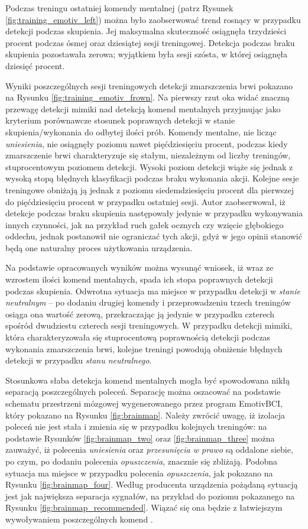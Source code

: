 \documentclass[skorowidz,skroty]{dyplomWEZUT}
\begin{document}
Podczas treningu ostatniej komendy mentalnej (patrz Rysunek \vref{fig:training_emotiv_left}) można było zaobserwować trend rosnący w przypadku detekcji podczas skupienia. Jej maksymalna skuteczność osiągnęła trzydzieści procent podczas ósmej oraz dziesiątej sesji treningowej. Detekcja podczas braku skupienia pozostawała zerowa; wyjątkiem była sesji szósta, w której osiągnęła dziesięć procent. 

Wyniki poszczególnych sesji treningowych detekcji zmarszczenia brwi pokazano na Rysunku \vref{fig:training_emotiv_frown}. Na pierwszy rzut oka widać znaczną przewagę detekcji mimiki nad detekcją komend mentalnych przyjmując jako kryterium porównawcze stosunek poprawnych detekcji w stanie skupienia/wykonania do odbytej ilości prób. Komendy mentalne, nie licząc \textit{uniesienia}, nie osiągnęły poziomu nawet pięćdziesięciu procent, podczas kiedy zmarszczenie brwi charakteryzuje się stałym, niezależnym od liczby treningów, stuprocentowym poziomem detekcji. Wysoki poziom detekcji wiąże się jednak z wysoką stopą błędnych klasyfikacji podczas braku wykonania akcji. Kolejne sesje treningowe obniżają ją jednak z poziomu siedemdziesięciu procent dla pierwszej do pięćdziesięciu procent w przypadku ostatniej sesji. Autor zaobserwował, iż detekcje podczas braku skupienia następowały jedynie w przypadku wykonywania innych czynności, jak na przykład ruch gałek ocznych czy wzięcie głębokiego oddechu, jednak postanowił nie ograniczać tych akcji, gdyż w jego opinii stanowić będą one naturalny proces użytkowania urządzenia.

Na podstawie opracowanych wyników można wysunąć wniosek, iż wraz ze wzrostem ilości komend mentalnych, spada ich stopa poprawnych detekcji podczas skupienia. Odwrotna sytuacja ma miejsce w przypadku detekcji w \textit{stanie neutralnym} -- po dodaniu drugiej komendy i przeprowadzeniu trzech treningów osiąga ona wartość zerową, przekraczając ją jedynie w przypadku czterech spośród dwudziestu czterech sesji treningowych. W przypadku detekcji mimiki, która charakteryzowała się stuprocentową poprawnością detekcji podczas wykonania zmarszczenia brwi, kolejne treningi powodują obniżenie błędnych detekcji w przypadku \textit{stanu neutralnego}.

Stosunkowa słaba detekcja komend mentalnych mogła być spowodowana nikłą separacją poszczególnych poleceń. Separację można oszacować na podstawie schematu przestrzeni mózgowej wygenerowanego przez program EmotivBCI, który pokazano na Rysunku \vref{fig:brainmap}. Należy zwrócić uwagę, iż izolacja poleceń nie jest stała i zmienia się w przypadku kolejnych treningów: na podstawie Rysunków \vref{fig:brainmap_two} oraz \vref{fig:brainmap_three} można zauważyć, iż polecenia \textit{uniesienia} oraz \textit{przesunięcia w prawo} są oddalone siebie, po czym, po dodaniu polecenia \textit{opuszczenia}, znacznie się zbliżają. Podobna sytuacja ma miejsce w przypadku polecenia \textit{opuszczenia}, jak pokazano na Rysunku \vref{fig:brainmap_four}. Według producenta urządzenia pożądaną sytuacją jest jak największa separacja sygnałów, na przykład do poziomu pokazanego na Rysunku \vref{fig:brainmap_recommended}. Wiązać się ona będzie z łatwiejszym wywoływaniem poszczególnych komend \cite{emotivbcidoc}.
\end{document}
